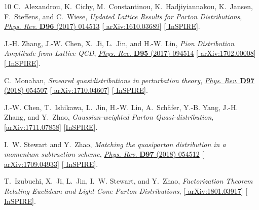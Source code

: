 \begin{thebibliography}{10}
C.~Alexandrou, K.~Cichy, M.~Constantinou, K.~Hadjiyiannakou, K.~Jansen,
  F.~Steffens, and C.~Wiese, {\it {Updated Lattice Results for Parton
  Distributions}},
\href{http://dx.doi.org/10.1103/PhysRevD.96.014513}{{\em Phys. Rev.} {\bfseries
  D96} (2017) 014513} [\href{http://arxiv.org/abs/1610.03689}{{\ttfamily
  arXiv:1610.03689}}] [\href{http://inspirehep.net/record/1491383}{{\ttfamily
  InSPIRE}}].

J.-H. Zhang, J.-W. Chen, X.~Ji, L.~Jin, and H.-W. Lin, {\it {Pion Distribution
  Amplitude from Lattice QCD}},
\href{http://dx.doi.org/10.1103/PhysRevD.95.094514}{{\em Phys. Rev.} {\bfseries
  D95} (2017) 094514} [\href{http://arxiv.org/abs/1702.00008}{{\ttfamily
  arXiv:1702.00008}}] [\href{http://inspirehep.net/record/1511678}{{\ttfamily
  InSPIRE}}].

C.~Monahan, {\it {Smeared quasidistributions in perturbation theory}},
\href{http://dx.doi.org/10.1103/PhysRevD.97.054507}{{\em Phys. Rev.} {\bfseries
  D97} (2018) 054507} [\href{http://arxiv.org/abs/1710.04607}{{\ttfamily
  arXiv:1710.04607}}] [\href{http://inspirehep.net/record/1630477}{{\ttfamily
  InSPIRE}}].

J.-W. Chen, T.~Ishikawa, L.~Jin, H.-W. Lin, A.~Sch\"afer, Y.-B. Yang, J.-H.
  Zhang, and Y.~Zhao,
{\it {Gaussian-weighted Parton Quasi-distribution}},
  [\href{http://arxiv.org/abs/1711.07858}{{\ttfamily arXiv:1711.07858}}]
  [\href{http://inspirehep.net/record/1637383}{{\ttfamily InSPIRE}}].

I.~W. Stewart and Y.~Zhao, {\it {Matching the quasiparton distribution in a
  momentum subtraction scheme}},
\href{http://dx.doi.org/10.1103/PhysRevD.97.054512}{{\em Phys. Rev.} {\bfseries
  D97} (2018) 054512} [\href{http://arxiv.org/abs/1709.04933}{{\ttfamily
  arXiv:1709.04933}}] [\href{http://inspirehep.net/record/1623909}{{\ttfamily
  InSPIRE}}].

T.~Izubuchi, X.~Ji, L.~Jin, I.~W. Stewart, and Y.~Zhao,
{\it {Factorization Theorem Relating Euclidean and Light-Cone Parton
  Distributions}},  [\href{http://arxiv.org/abs/1801.03917}{{\ttfamily
  arXiv:1801.03917}}] [\href{http://inspirehep.net/record/1647571}{{\ttfamily
  InSPIRE}}].


\end{thebibliography}
